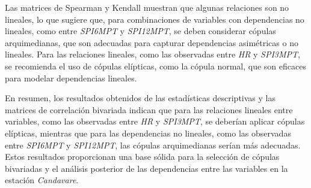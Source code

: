 Las matrices de Spearman y Kendall muestran que algunas relaciones son no lineales, lo que sugiere que, para combinaciones de variables con dependencias no lineales, como entre \textit{SPI6MPT} y \textit{SPI12MPT}, se deben considerar cópulas arquimedianas, que son adecuadas para capturar dependencias asimétricas o no lineales. Para las relaciones lineales, como las observadas entre \textit{HR} y \textit{SPI3MPT}, se recomienda el uso de cópulas elípticas, como la cópula normal, que son eficaces para modelar dependencias lineales.

En resumen, los resultados obtenidos de las estadísticas descriptivas y las matrices de correlación bivariada indican que para las relaciones lineales entre variables, como las observadas entre \textit{HR} y \textit{SPI3MPT}, se deberían aplicar cópulas elípticas, mientras que para las dependencias no lineales, como las observadas entre \textit{SPI6MPT} y \textit{SPI12MPT}, las cópulas arquimedianas serían más adecuadas. Estos resultados proporcionan una base sólida para la selección de cópulas bivariadas y el análisis posterior de las dependencias entre las variables en la estación \textit{Candavare}.


